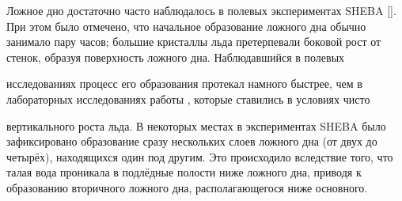 






Ложное дно достаточно часто наблюдалось в полевых экспериментах \linebreak SHEBA []. При этом было отмечено, что начальное образование ложного дна обычно занимало пару часов; большие кристаллы льда претерпевали боковой рост от стенок, образуя поверхность ложного дна. Наблюдавшийся в полевых 

исследованиях процесс его образования протекал намного быстрее, чем в лабораторных исследованиях работы \cite{niz:bib:1}, которые ставились в условиях чисто 

вертикального роста льда. В некоторых местах в экспериментах SHEBA было зафиксировано образование сразу нескольких слоев ложного дна (от двух до четырёх), находящихся один под другим. Это происходило вследствие того, что талая вода проникала в подлёдные полости ниже ложного дна, приводя к образованию вторичного ложного дна, располагающегося ниже основного.



